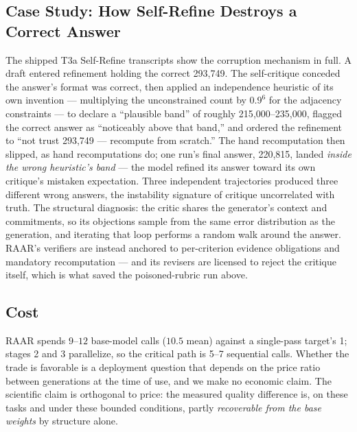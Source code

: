 \documentclass[journal]{IEEEtran}
\newcommand{\method}{RAAR}
\begin{document}
\subsection{Case Study: How Self-Refine Destroys a Correct Answer}
\label{sec:selfrefine-case}
The shipped T3a Self-Refine transcripts show the corruption mechanism in
full. A draft entered refinement holding the correct 293{,}749. The
self-critique conceded the answer's format was correct, then applied an
independence heuristic of its own invention --- multiplying the
unconstrained count by $0.9^6$ for the adjacency constraints --- to
declare a ``plausible band'' of roughly 215{,}000--235{,}000, flagged the
correct answer as ``noticeably above that band,'' and ordered the
refinement to ``not trust 293{,}749 --- recompute from scratch.'' The
hand recomputation then slipped, as hand recomputations do; one run's
final answer, 220{,}815, landed \emph{inside the wrong heuristic's band}
--- the model refined its answer toward its own critique's mistaken
expectation. Three independent trajectories produced three different
wrong answers, the instability signature of critique uncorrelated with
truth. The structural diagnosis: the critic shares the generator's context
and commitments, so its objections sample from the same error distribution
as the generation, and iterating that loop performs a random walk around
the answer. \method{}'s verifiers are instead anchored to per-criterion
evidence obligations and mandatory recomputation --- and its revisers are
licensed to reject the critique itself, which is what saved the
poisoned-rubric run above.

\subsection{Cost}
\method{} spends $9$--$12$ base-model calls ($10.5$ mean) against a
single-pass target's 1; stages 2 and 3 parallelize, so the critical path is 5--7
sequential calls. Whether the trade is favorable is a deployment question
that depends on the price ratio between generations at the time of use,
and we make no economic claim. The scientific claim is orthogonal to
price: the measured quality difference is, on these tasks and under these
bounded conditions, partly \emph{recoverable from the base weights} by
structure alone.
\end{document}
